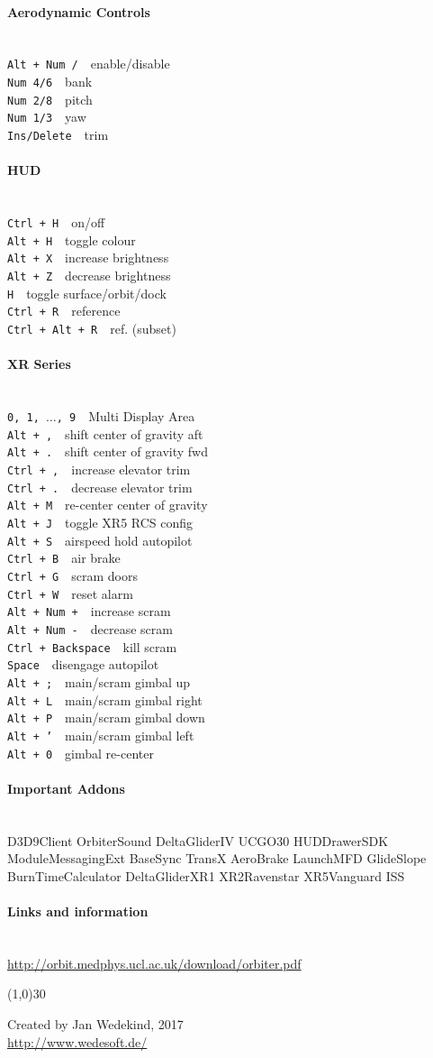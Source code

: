 \documentclass[11pt]{scrartcl} %
\newcommand{\command}[2]{\texttt{#1}~\dotfill{}~#2\\} %
\newcommand{\sectiontitle}[1]{\paragraph{#1} \ \\} %
\newcommand{\sep}{\hspace{5mm}}
\begin{document}
\sep
\begin{minipage}[t]{60mm}
\sectiontitle{Aerodynamic Controls}
\command{Alt + Num /}{enable/disable}
\command{Num 4/6}{bank}
\command{Num 2/8}{pitch}
\command{Num 1/3}{yaw}
\command{Ins/Delete}{trim}

\sectiontitle{HUD}
\command{Ctrl + H}{on/off}
\command{Alt + H}{toggle colour}
\command{Alt + X}{increase brightness}
\command{Alt + Z}{decrease brightness}
\command{H}{toggle surface/orbit/dock}
\command{Ctrl + R}{reference}
\command{Ctrl + Alt + R}{ref. (subset)}

\sectiontitle{XR Series}
\command{0, 1, $\ldots$, 9}{Multi Display Area}
\command{Alt + ,}{shift center of gravity aft}
\command{Alt + .}{shift center of gravity fwd}
\command{Ctrl + ,}{increase elevator trim}
\command{Ctrl + .}{decrease elevator trim}
\command{Alt + M}{re-center center of gravity}
\command{Alt + J}{toggle XR5 RCS config}
\command{Alt + S}{airspeed hold autopilot}
\command{Ctrl + B}{air brake}
\command{Ctrl + G}{scram doors}
\command{Ctrl + W}{reset alarm}
\command{Alt + Num +}{increase scram}
\command{Alt + Num -}{decrease scram}
\command{Ctrl + Backspace}{kill scram}
\command{Space}{disengage autopilot}
\command{Alt + ;}{main/scram gimbal up}
\command{Alt + L}{main/scram gimbal right}
\command{Alt + P}{main/scram gimbal down}
\command{Alt + '}{main/scram gimbal left}
\command{Alt + 0}{gimbal re-center}
\end{minipage}
\sep
\begin{minipage}[t]{60mm}
\sectiontitle{Important Addons}
D3D9Client
OrbiterSound
DeltaGliderIV
UCGO30
HUDDrawerSDK
ModuleMessagingExt
BaseSync
TransX
AeroBrake
LaunchMFD
GlideSlope
BurnTimeCalculator
DeltaGliderXR1
XR2Ravenstar
XR5Vanguard
ISS\\

\vspace{\baselineskip}
\sectiontitle{Links and information}

\url{http://orbit.medphys.ucl.ac.uk/download/orbiter.pdf}

\linethickness{0.5mm} %
{\color{mygray}\line(1,0){30}} %

\footnotesize{
Created by Jan Wedekind, 2017\\
\url{http://www.wedesoft.de/}\\
}

\end{minipage} %
\end{document}
